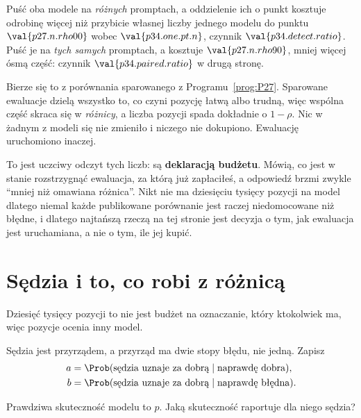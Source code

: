 \begin{fr}

Puść oba modele na \emph{różnych} promptach, a oddzielenie ich o punkt
kosztuje odrobinę więcej niż przybicie własnej liczby jednego modelu do punktu
\dash{} $\val{p27.n.rho00}$ wobec $\val{p34.one.pt.n}$, czynnik
$\val{p34.detect.ratio}$. Puść je na \emph{tych samych} promptach, a kosztuje
$\val{p27.n.rho90}$, mniej więcej ósmą część: czynnik
$\val{p34.paired.ratio}$ w drugą stronę.

Bierze się to z porównania sparowanego z Programu~\ref{prog:P27}. Sparowane
ewaluacje dzielą wszystko to, co czyni pozycję łatwą albo trudną, więc
wspólna część skraca się w \emph{różnicy}, a liczba pozycji spada dokładnie o
$1-\rho$. Nic w żadnym z modeli się nie zmieniło i niczego nie dokupiono.
Ewaluację uruchomiono inaczej.

\begin{note}
To jest uczciwy odczyt tych liczb: są \textbf{deklaracją budżetu}. Mówią,
co jest w stanie rozstrzygnąć ewaluacja, za którą już zapłaciłeś, a
odpowiedź brzmi zwykle \enquote{mniej niż omawiana różnica}. Nikt nie ma
dziesięciu tysięcy pozycji na model \dash{} dlatego niemal każde publikowane
porównanie jest raczej niedomocowane niż błędne, i dlatego najtańszą rzeczą na
tej stronie jest decyzja o tym, jak ewaluacja jest uruchamiana, a nie o tym,
ile jej kupić.
\end{note}
\end{fr}

\section{Sędzia i to, co robi z różnicą}
\label{sec:P34-judge}

\begin{fr}
Dziesięć tysięcy pozycji to nie jest budżet na oznaczanie, który ktokolwiek
ma, więc pozycje ocenia inny model.

Sędzia jest przyrządem, a przyrząd ma dwie stopy błędu, nie jedną. Zapisz
\begin{align*}
  a &= \Prob(\text{sędzia uznaje za dobrą} \mid \text{naprawdę dobra}), \\
  b &= \Prob(\text{sędzia uznaje za dobrą} \mid \text{naprawdę błędna}).
\end{align*}

Prawdziwa skuteczność modelu to $p$. Jaką skuteczność raportuje dla niego
sędzia?
\dotline
\nextframe
\end{fr}

